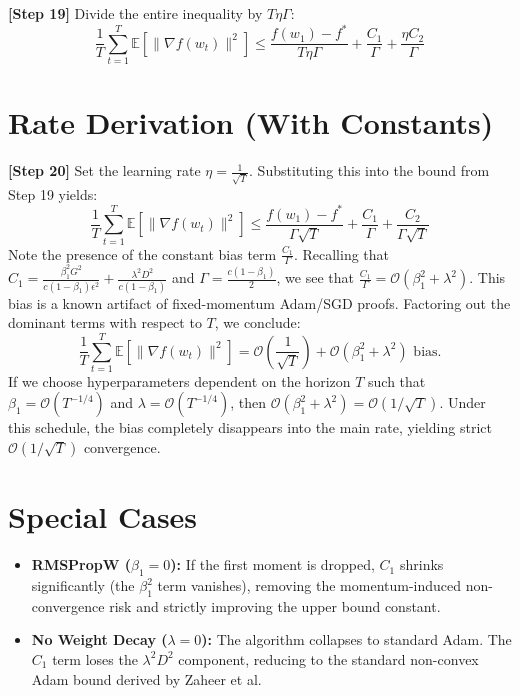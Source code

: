 \documentclass[11pt]{article}
\begin{document}
\textbf{[Step 19]} Divide the entire inequality by $T \eta \Gamma$:
\begin{equation}
    \frac{1}{T} \sum_{t=1}^T \mathbb{E}[\|\nabla f(w_t)\|^2] \leq \frac{f(w_1) - f^*}{T \eta \Gamma} + \frac{C_1}{\Gamma} + \frac{\eta C_2}{\Gamma}
\end{equation}

\section*{Rate Derivation (With Constants)}

\textbf{[Step 20]} Set the learning rate $\eta = \frac{1}{\sqrt{T}}$. Substituting this into the bound from Step 19 yields:
\begin{equation}
    \frac{1}{T} \sum_{t=1}^T \mathbb{E}[\|\nabla f(w_t)\|^2] \leq \frac{f(w_1) - f^*}{\Gamma \sqrt{T}} + \frac{C_1}{\Gamma} + \frac{C_2}{\Gamma \sqrt{T}}
\end{equation}
Note the presence of the constant bias term $\frac{C_1}{\Gamma}$. Recalling that $C_1 = \frac{\beta_1^2 G^2}{c(1-\beta_1)\epsilon^2} + \frac{\lambda^2 D^2}{c(1-\beta_1)}$ and $\Gamma = \frac{c(1-\beta_1)}{2}$, we see that $\frac{C_1}{\Gamma} = \mathcal{O}(\beta_1^2 + \lambda^2)$. This bias is a known artifact of fixed-momentum Adam/SGD proofs. Factoring out the dominant terms with respect to $T$, we conclude:
\begin{equation}
    \frac{1}{T} \sum_{t=1}^T \mathbb{E}[\|\nabla f(w_t)\|^2] = \mathcal{O}\left(\frac{1}{\sqrt{T}}\right) + \mathcal{O}(\beta_1^2 + \lambda^2) \text{ bias.}
\end{equation}
If we choose hyperparameters dependent on the horizon $T$ such that $\beta_1 = \mathcal{O}(T^{-1/4})$ and $\lambda = \mathcal{O}(T^{-1/4})$, then $\mathcal{O}(\beta_1^2 + \lambda^2) = \mathcal{O}(1/\sqrt{T})$. Under this schedule, the bias completely disappears into the main rate, yielding strict $\mathcal{O}(1/\sqrt{T})$ convergence.

\section*{Special Cases}
\begin{itemize}
    \item \textbf{RMSPropW ($\beta_1 = 0$):} If the first moment is dropped, $C_1$ shrinks significantly (the $\beta_1^2$ term vanishes), removing the momentum-induced non-convergence risk and strictly improving the upper bound constant.
    \item \textbf{No Weight Decay ($\lambda = 0$):} The algorithm collapses to standard Adam. The $C_1$ term loses the $\lambda^2 D^2$ component, reducing to the standard non-convex Adam bound derived by Zaheer et al.
\end{itemize}
\end{document}
